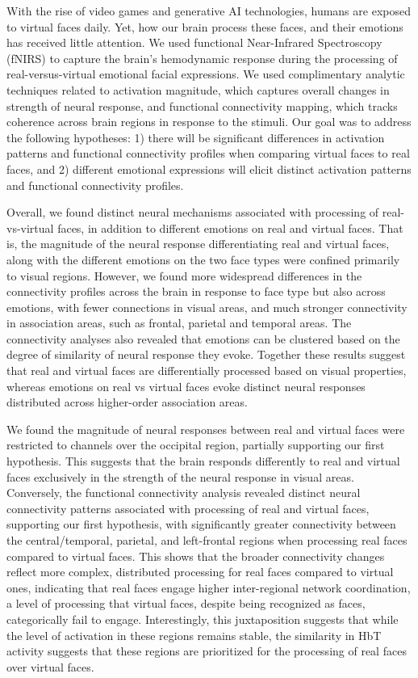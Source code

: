 With the rise of video games and generative AI technologies, humans are exposed to virtual faces daily. 
Yet, how our brain process these faces, and their emotions has received little attention. 
We used functional Near-Infrared Spectroscopy (fNIRS) to capture the brain's hemodynamic response during the processing of real-versus-virtual emotional facial expressions. 
We used complimentary analytic techniques related to activation magnitude, which captures overall changes in strength of neural response, and functional connectivity mapping, which tracks coherence across brain regions in response to the stimuli. 
Our goal was to address the following hypotheses: 1) there will be significant differences in activation patterns and functional connectivity profiles when comparing virtual faces to real faces, and 2) different emotional expressions will elicit distinct activation patterns and functional connectivity profiles.

Overall, we found distinct neural mechanisms associated with processing of real-vs-virtual faces, in addition to different emotions on real and virtual faces. 
That is, the magnitude of the neural response differentiating real and virtual faces, along with the different emotions on the two face types were confined primarily to visual regions. 
However, we found more widespread differences in the connectivity profiles across the brain in response to face type but also across emotions, with fewer connections in visual areas, and much stronger connectivity in association areas, such as frontal, parietal and temporal areas. 
The connectivity analyses also revealed that emotions can be clustered based on the degree of similarity of neural response they evoke. 
Together these results suggest that real and virtual faces are differentially processed based on visual properties, whereas emotions on real vs virtual faces evoke distinct neural responses distributed across higher-order association areas. 

We found the magnitude of neural responses between real and virtual faces were restricted to channels over the occipital region, partially supporting our first hypothesis. 
This suggests that the brain responds differently to real and virtual faces exclusively in the strength of the neural response in visual areas. 
Conversely, the functional connectivity analysis revealed distinct neural connectivity patterns associated with processing of real and virtual faces, supporting our first hypothesis, with significantly greater connectivity between the central/temporal, parietal, and left-frontal regions when processing real faces compared to virtual faces.
This shows that the broader connectivity changes reflect more complex, distributed processing for real faces compared to virtual ones, indicating that real faces engage higher inter-regional network coordination, a level of processing that virtual faces, despite being recognized as faces, categorically fail to engage.
Interestingly, this juxtaposition suggests that while the level of activation in these regions remains stable, the similarity in HbT activity suggests that these regions are prioritized for the processing of real faces over virtual faces.      

